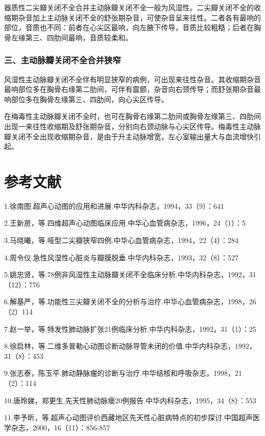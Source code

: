 器质性二尖瓣关闭不全合并主动脉瓣关闭不全一般为风湿性。二尖瓣关闭不全的收缩期杂音加上主动脉关闭不全的舒张期杂音，可使杂音呈来往性。二者各有最响的部位，音质也不同：前者在心尖区最响，向左腋下传导，音质比较粗糙；后者在胸骨左缘第三、四肋间最响，音质较柔和。

\subsubsection{三、主动脉瓣关闭不全合并狭窄}

风湿性主动脉瓣关闭不全伴有明显狭窄的病例，可出现来往性杂音。其收缩期杂音最响部位多在胸骨右缘第二肋间，可伴有震颤，杂音向右颈传导；而舒张期杂音最响部位多在胸骨左缘第三、四肋间，向心尖区传导。

在梅毒性主动脉瓣关闭不全时，也可在胸骨右缘第二肋间或胸骨左缘第三、四肋间出现一来往性收缩期及舒张期杂音，分别向右颈动脉与心尖区传导。梅毒性主动脉瓣关闭不全出现收缩期杂音，是由于升主动脉增宽，左心室输出量大与血流增快引起。

\protect\hypertarget{text00132.html}{}{}

\section{参考文献}

1.徐南图.超声心动图的应用和进展.中华内科杂志，1994，33（9）：641

2.王新房，等.四维超声心动图临床应用.中华心血管病杂志，1996，24（1）：5

3.马晓曦，等.哑型二尖瓣狭窄四例.中华心血管病杂志，1994，22（4）：284

4.周令仪.急性风湿性心脏炎与瓣膜脱垂.中华内科杂志，1993，32（8）：527

5.姚忠贤，等.78例非风湿性主动脉瓣关闭不全临床分析.中华内科杂志，1992，31（12）：776

6.解基严，等.功能性三尖瓣关闭不全的分析与治疗.中华心血管病杂志，1998，26（2）114

7.赵一举，等.特发性肺动脉扩张21例临床分析.中华内科杂志，1992，31（1）：25

8.徐启林，等.二维多普勒心动图诊断动脉导管未闭的价值.中华内科杂志，1992，31（8）：453

9.张志泰，陈玉平.肺动静脉瘤的诊断与治疗.中华结核和呼吸杂志，1998，21（2）：114

10.唐玲娣，郑更生.先天性肺动脉瘘20例报告.中华内科杂志，1995，34（8）：553

11.李予昕，等.超声心动图评价西藏地区先天性心脏病特点的初步探讨.中国超声医学杂志，2000，16（11）：856-857

